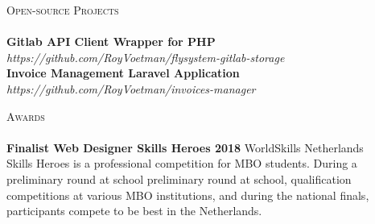 \documentclass[a4paper]{article}
\newcommand{\lineunder} {
    \vspace*{-8pt} \\
    \hspace*{-18pt} \hrulefill \\
}
\newcommand{\header} [1] {
    {\hspace*{-18pt}\vspace*{6pt} \textsc{#1}}
    \vspace*{-6pt} \lineunder
}
\begin{document}
\header{Open-source Projects}
{\textbf{Gitlab API Client Wrapper for PHP}} \\ \emph{https://github.com/RoyVoetman/flysystem-gitlab-storage}\\
\vspace*{2mm}
{\textbf{Invoice Management Laravel Application}} \\ \emph{https://github.com/RoyVoetman/invoices-manager}\\
\vspace*{2mm}

\header{Awards}
\textbf{Finalist Web Designer Skills Heroes 2018} \hfill WorldSkills Netherlands\\
Skills Heroes is a professional competition for MBO students. During a  preliminary round at school preliminary round at school, qualification competitions at various MBO institutions, and during the national finals, participants compete to be best in the Netherlands.
\vspace*{2mm}

\ 
\end{document}

